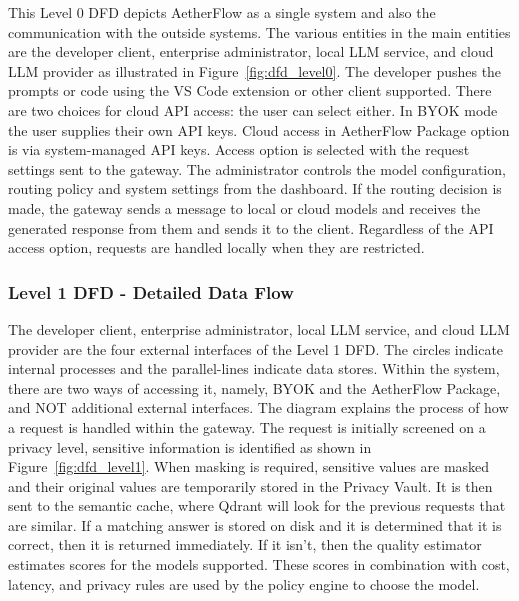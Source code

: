 \documentclass{FastFyp}
\begin{document}
This Level 0 DFD depicts AetherFlow as a single system and also the communication with the outside systems. The various entities in the main entities are the developer client, enterprise administrator, local LLM service, and cloud LLM provider as illustrated in Figure~\ref{fig:dfd_level0}.
The developer pushes the prompts or code using the VS Code extension or other client supported. There are two choices for cloud API access: the user can select either. In BYOK mode the user supplies their own API keys. Cloud access in AetherFlow Package option is via system-managed API keys. Access option is selected with the request settings sent to the gateway.
The administrator controls the model configuration, routing policy and system settings from the dashboard. If the routing decision is made, the gateway sends a message to local or cloud models and receives the generated response from them and sends it to the client. Regardless of the API access option, requests are handled locally when they are restricted.



\subsubsection{Level 1 DFD - Detailed Data Flow}
\label{sec:dfd_level1}

The developer client, enterprise administrator, local LLM service, and cloud LLM provider are the four external interfaces of the Level 1 DFD. The circles indicate internal processes and the parallel-lines indicate data stores. Within the system, there are two ways of accessing it, namely, BYOK and the AetherFlow Package, and NOT additional external interfaces. The diagram explains the process of how a request is handled within the gateway. The request is initially screened on a privacy level, sensitive information is identified as shown in Figure~\ref{fig:dfd_level1}. When masking is required, sensitive values are masked and their original values are temporarily stored in the Privacy Vault.
It is then sent to the semantic cache, where Qdrant will look for the previous requests that are similar. If a matching answer is stored on disk and it is determined that it is correct, then it is returned immediately. If it isn't, then the quality estimator estimates scores for the models supported. These scores in combination with cost, latency, and privacy rules are used by the policy engine to choose the model.
\end{document}
